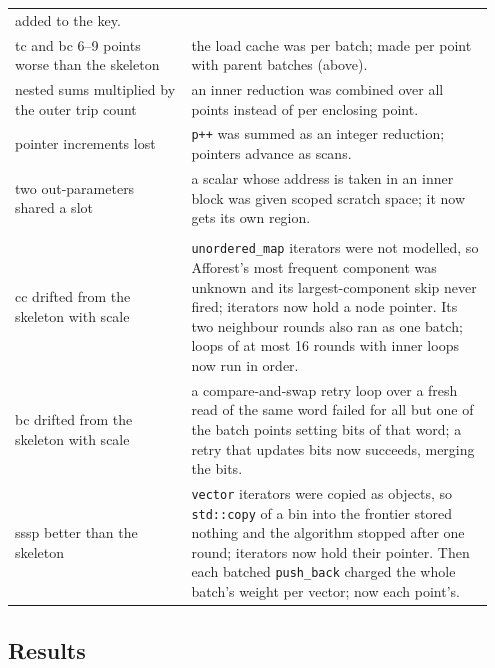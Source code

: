 \documentclass[11pt]{article}
\newcommand{\fittable}[1]{\sbox{\fitbox}{}%
  \ifdim\wd\fitbox>\linewidth\resizebox{\linewidth}{!}{\usebox{\fitbox}}\else\usebox{\fitbox}\fi}
\newcommand{\code}[1]{\texttt{#1}}
\newcommand{\secref}[1]{Section~\ref{#1}}
\begin{document}
\begin{table}[!htbp]
\begin{tabular}{>{\raggedright\arraybackslash}p{0.35\linewidth}>{\raggedright\arraybackslash}p{0.6\linewidth}}
added to the key. \\
tc and bc 6--9 points worse than the skeleton & the load cache was per batch; made per point with parent batches
(above). \\
nested sums multiplied by the outer trip count & an inner reduction was combined over all points instead of per
enclosing point. \\
pointer increments lost & \code{p++} was summed as an integer reduction; pointers advance as scans. \\
two out-parameters shared a slot & a scalar whose address is taken in an inner block was given scoped scratch
space; it now gets its own region. \\
\midrule
\multicolumn{2}{l}{\textit{Found while preparing the second blind test (\secref{sec:blind2}):}} \\
cc drifted from the skeleton with scale & \code{unordered\_map} iterators were not modelled, so Afforest's most frequent
component was unknown and its largest-component skip never fired; iterators now hold a node pointer. Its two neighbour
rounds also ran as one batch; loops of at most 16 rounds with inner loops now run in order. \\
bc drifted from the skeleton with scale & a compare-and-swap retry loop over a fresh read of the same word failed for
all but one of the batch points setting bits of that word; a retry that updates bits now succeeds, merging the bits. \\
sssp better than the skeleton & \code{vector} iterators were copied as objects, so \code{std::copy} of a bin into the
frontier stored nothing and the algorithm stopped after one round; iterators now hold their pointer. Then each batched
\code{push\_back} charged the whole batch's weight per vector; now each point's. \\
\bottomrule
\end{tabular}
\end{table}

\subsection{Results}

\begin{table}[!htbp]
\centering\small
\caption[C++ interpreter against the hand skeleton]{GAP from its C++ source: largest footprint error and mean $\alpha$
MAPE over the scales computed, for the hand skeleton and the interpreter, and the ratio of their total reference counts
(median over scales).}
\label{tab:auto}
\fittable{tables/auto.tex}
\end{table}
\end{document}
